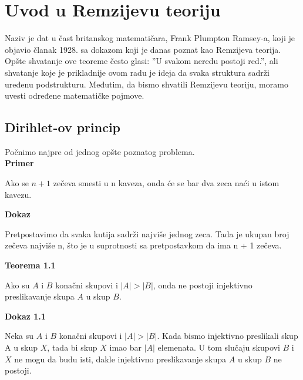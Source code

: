 \documentclass[12pt,a4paper]{article}
\begin{document}
	
	\tableofcontents
	\newpage
	
	\section{Uvod u Remzijevu teoriju}
	
	\noindent Naziv je dat u čast britanskog matematičara, Frank Plumpton Ramsey-a, koji je objavio članak
	1928. sa dokazom koji je danas poznat kao Remzijeva teorija. Opšte shvatanje ove teoreme često glasi:
	''U svakom neredu postoji red.'', ali shvatanje koje je prikladnije ovom radu je ideja da svaka
	struktura sadrži uređenu podstrukturu. Međutim, da bismo shvatili Remzijevu teoriju, moramo uvesti
	određene matematičke pojmove.

	\subsection{Dirihlet-ov princip}
	\vspace{0.5em}
	
	Počnimo najpre od jednog opšte poznatog problema.	
	\vspace{0.5em}
	\\
	{\noindent\fontsize{12pt}{12pt}\textbf{Primer}}
	\vspace{0.5em}
 	
	\noindent Ako se $n + 1$ zečeva smesti u n kaveza, onda će se bar dva zeca naći u istom kavezu.
	\vspace{1.5em}

	{\noindent\fontsize{12pt}{12pt}\textbf{Dokaz}}
	\vspace{0.5em}	

	\noindent Pretpostavimo da svaka kutija sadrži najviše jednog zeca. Tada je ukupan broj zečeva
	najviše n, što je u suprotnosti sa pretpostavkom da ima n + 1 zečeva. 
	\vspace{1.5em}	

	{\noindent\fontsize{12pt}{12pt}\textbf{Teorema 1.1}}
	\vspace{0.5em}

	\noindent Ako su $A$ i $B$ konačni skupovi i $|A| > |B|$, onda ne postoji injektivno preslikavanje skupa $A$ u
	skup $B$.
	\vspace{1.5em}

	{\noindent\fontsize{12pt}{12pt}\textbf{Dokaz 1.1}}
	\vspace{0.5em}	

	\noindent Neka su $A$ i $B$ konačni skupovi i $|A| > |B|$. Kada bismo injektivno preslikali skup A
	u skup $X$, tada bi skup $X$ imao bar $|A|$ elemenata. U tom slučaju skupovi $B$ i $X$ ne mogu da budu isti, dakle injektivno preslikavanje skupa $A$ u skup $B$ ne postoji.
\end{document}
